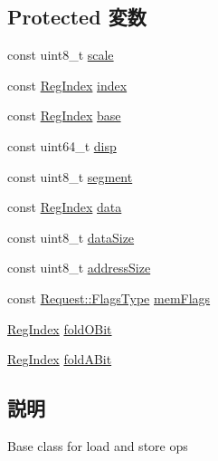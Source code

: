 \subsection*{Protected 変数}
\begin{DoxyCompactItemize}
\item 
const uint8\_\-t \hyperlink{classX86ISA_1_1LdStOp_acc20e32e37546aa4285dbde102c6bdbe}{scale}
\item 
const \hyperlink{classStaticInst_a36d25e03e43fa3bb4c5482cbefe5e0fb}{RegIndex} \hyperlink{classX86ISA_1_1LdStOp_a28d42434456230011d33ff417d51ec7f}{index}
\item 
const \hyperlink{classStaticInst_a36d25e03e43fa3bb4c5482cbefe5e0fb}{RegIndex} \hyperlink{classX86ISA_1_1LdStOp_aea1da85e3f0ea021e5bd319ae984fccd}{base}
\item 
const uint64\_\-t \hyperlink{classX86ISA_1_1LdStOp_a883c5d3ddab46caee5dc457a44131de7}{disp}
\item 
const uint8\_\-t \hyperlink{classX86ISA_1_1LdStOp_aa6f211b9ff8d0fc44b861c5873f45627}{segment}
\item 
const \hyperlink{classStaticInst_a36d25e03e43fa3bb4c5482cbefe5e0fb}{RegIndex} \hyperlink{classX86ISA_1_1LdStOp_a2dd4f443c6c437abbe8912de0d5853bd}{data}
\item 
const uint8\_\-t \hyperlink{classX86ISA_1_1LdStOp_a107c258b340f17c2bfd8326ada8441ce}{dataSize}
\item 
const uint8\_\-t \hyperlink{classX86ISA_1_1LdStOp_a115c95fa2df0696caf11180fdf625657}{addressSize}
\item 
const \hyperlink{classRequest_a2da503161d95c65aea559dbabcf570aa}{Request::FlagsType} \hyperlink{classX86ISA_1_1LdStOp_a7e5e9c87d0a97e7e677561e01b57ef8b}{memFlags}
\item 
\hyperlink{classStaticInst_a36d25e03e43fa3bb4c5482cbefe5e0fb}{RegIndex} \hyperlink{classX86ISA_1_1LdStOp_a90c82d522b8ec23488d1dab400eb43d8}{foldOBit}
\item 
\hyperlink{classStaticInst_a36d25e03e43fa3bb4c5482cbefe5e0fb}{RegIndex} \hyperlink{classX86ISA_1_1LdStOp_a82e4e8572bd1bbb96ee71124cce3b6bb}{foldABit}
\end{DoxyCompactItemize}


\subsection{説明}
Base class for load and store ops 

